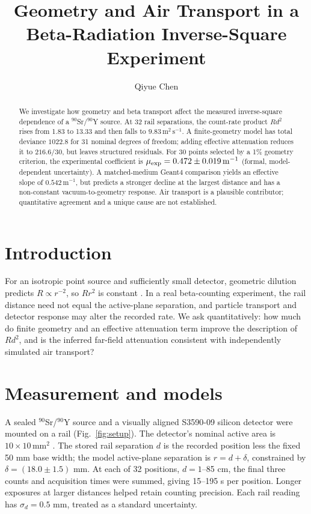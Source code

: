 \documentclass[journal,a4paper]{IEEEtran}
\begin{document}
\title{Geometry and Air Transport in a Beta-Radiation Inverse-Square Experiment}
\author{Qiyue Chen}
\maketitle
\begin{abstract}
We investigate how geometry and beta transport affect the measured inverse-square dependence of a $^{90}$Sr/$^{90}$Y source. At 32 rail separations, the count-rate product $Rd^2$ rises from 1.83 to 13.33 and then falls to $9.83\,\mathrm{m^2\,s^{-1}}$. A finite-geometry model has total deviance $1022.8$ for 31 nominal degrees of freedom; adding effective attenuation reduces it to $216.6/30$, but leaves structured residuals. For 30 points selected by a 1\% geometry criterion, the experimental coefficient is $\mu_{\rm exp}=0.472\pm0.019\,\mathrm{m^{-1}}$ (formal, model-dependent uncertainty). A matched-medium Geant4 comparison yields an effective slope of $0.542\,\mathrm{m^{-1}}$, but predicts a stronger decline at the largest distance and has a non-constant vacuum-to-geometry response. Air transport is a plausible contributor; quantitative agreement and a unique cause are not established.
\end{abstract}

\section{Introduction}
For an isotropic point source and sufficiently small detector, geometric dilution predicts $R\propto r^{-2}$, so $Rr^2$ is constant \cite{script}. In a real beta-counting experiment, the rail distance need not equal the active-plane separation, and particle transport and detector response may alter the recorded rate. We ask quantitatively: how much do finite geometry and an effective attenuation term improve the description of $Rd^2$, and is the inferred far-field attenuation consistent with independently simulated air transport?

\section{Measurement and models}
A sealed $^{90}$Sr/$^{90}$Y source and a visually aligned S3590-09 silicon detector were mounted on a rail (Fig.~\ref{fig:setup}). The detector's nominal active area is $10\times10\,\mathrm{mm^2}$ \cite{sensor}. The stored rail separation $d$ is the recorded position less the fixed 50 mm base width; the model active-plane separation is $r=d+\delta$, constrained by $\delta=(18.0\pm1.5)$ mm. At each of 32 positions, $d=1$--85 cm, the final three counts and acquisition times were summed, giving 15--195 s per position. Longer exposures at larger distances helped retain counting precision. Each rail reading has $\sigma_d=0.5$ mm, treated as a standard uncertainty.
\end{document}
